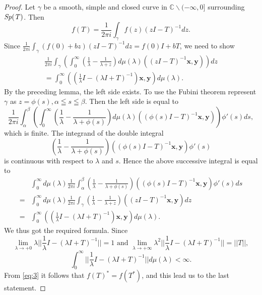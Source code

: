 \documentclass[10pt,a4paper]{amsart}
\begin{document}
\begin{proof}
Let $\gamma$ be a smooth, simple and closed curve in $\mathbb{C} \smallsetminus (-\infty, 0]$ 
 surrounding $\it{Sp}(T)$. Then 
$$f(T) = \frac{1}{2\pi i} \int_{\gamma}  f(z) (z I - T)^{-1} dz.$$
Since $\frac{1}{2\pi i} \int_{\gamma}  (f(0) + b z) (z I - T)^{-1} dz = f(0) I  + b T$, we need to show 
\begin{gather*}
\frac{1}{2\pi i} \int_{\gamma} \left(\int_0^{\infty} (\frac{1}{\lambda } - \frac{1}{\lambda + z}) d\mu(\lambda) 
((z I - T)^{-1} \mathbf{x}, \mathbf{y})\right) dz\\
= \int_0^{\infty} ((\frac{1}{\lambda } I - (\lambda I  + T)^{-1}) \mathbf{x}, \mathbf{y})  d\mu(\lambda).
\end{gather*}
By the preceding lemma, the left side exists. To use the Fubini theorem
 represent $\gamma$ as 
$ z=\phi (s), \alpha \leqq s \leqq \beta$. Then the left side is equal to 
$$\frac{1}{2\pi i} \int_{\alpha}^{\beta} \left(\int_0^{\infty} (\frac{1}{\lambda} - \frac{1}{\lambda + \phi (s)})
d\mu(\lambda) 
((\phi (s) I - T)^{-1} \mathbf{x}, \mathbf{y}) \right) \phi'(s) d s,$$
which is finite. 
The integrand of the double integral 
$$(\frac{1}{\lambda} - \frac{1}{\lambda + \phi (s)}) ((\phi (s) I - T)^{-1} \mathbf{x}, \mathbf{y}) \phi'(s)$$
is continuous with respect to  $\lambda$ and $s$. Hence the above successive integral is equal to 
\begin{align*}
&\int_0^{\infty}d\mu(\lambda) 
\frac{1}{2\pi i} \int_{\alpha}^{\beta} (\frac{1}{\lambda} - \frac{1}{\lambda + \phi (s)}) ((\phi (s) I - T)^{-1}
 \mathbf{x}, \mathbf{y})  \phi'(s) d s\\
= & \int_0^{\infty}d\mu(\lambda) \frac{1}{2\pi i} \int_{\gamma} (\frac{1}{\lambda} 
- \frac{1}{\lambda + z})
 ((z I - T)^{-1} \mathbf{x}, \mathbf{y})  d z\\
=&  \int_0^{\infty}((\frac{1}{\lambda}I -
(\lambda I + T)^{-1}) \mathbf{x}, \mathbf{y}) d \mu(\lambda). 
\end{align*}
We thus got the required formula.  
Since 
$$\lim_{\lambda \to + 0} \lambda ||\frac{1}{\lambda} I - (\lambda I  + T)^{-1}|| = 1\, \, \text{and} \, \,
\lim_{\lambda \to + \infty} \lambda^2 ||\frac{1}{\lambda} I - (\lambda I  + T)^{-1}|| = || T||,$$ 
 $$\int_0^{\infty} ||\frac{1}{\lambda} I - (\lambda I  + T)^{-1}|| d\mu(\lambda)
<\infty.$$
From \eqref{eq:3} it follows that $f(T)^* = f(T^*)$, and this lead us to the last statement.
\end{proof}
\end{document}
